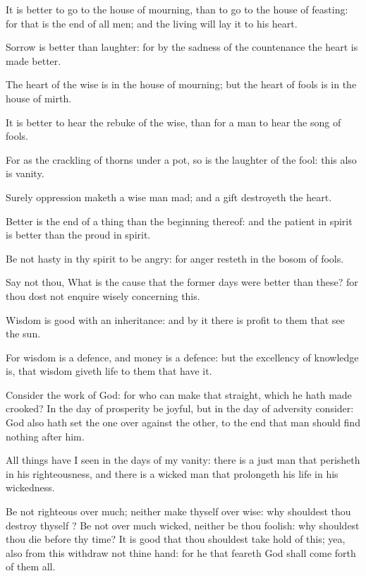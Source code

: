 \Verse It is better to go to the house of mourning, than to go to the house of feasting: for that is the end of all men; and the living will lay it to his heart.

\Verse Sorrow is better than laughter: for by the sadness of the countenance the heart is made better.

\Verse The heart of the wise is in the house of mourning; but the heart of fools is in the house of mirth.

\Verse It is better to hear the rebuke of the wise, than for a man to hear the song of fools.

\Verse For as the crackling of thorns under a pot, so is the laughter of the fool: this also is vanity.

\Verse Surely oppression maketh a wise man mad; and a gift destroyeth the heart.

\Verse Better is the end of a thing than the beginning thereof: and the patient in spirit is better than the proud in spirit.

\Verse Be not hasty in thy spirit to be angry: for anger resteth in the bosom of fools.

\Verse Say not thou, What is the cause that the former days were better than these? for thou dost not enquire wisely concerning this.

\Verse Wisdom is good with an inheritance: and by it there is profit to them that see the sun.

\Verse For wisdom is a defence, and money is a defence: but the excellency of knowledge is, that wisdom giveth life to them that have it.

\Verse Consider the work of God: for who can make that straight, which he hath made crooked?  \Verse In the day of prosperity be joyful, but in the day of adversity consider: God also hath set the one over against the other, to the end that man should find nothing after him.

\Verse All things have I seen in the days of my vanity: there is a just man that perisheth in his righteousness, and there is a wicked man that prolongeth his life in his wickedness.

\Verse Be not righteous over much; neither make thyself over wise: why shouldest thou destroy thyself ?  \Verse Be not over much wicked, neither be thou foolish: why shouldest thou die before thy time?  \Verse It is good that thou shouldest take hold of this; yea, also from this withdraw not thine hand: for he that feareth God shall come forth of them all.

